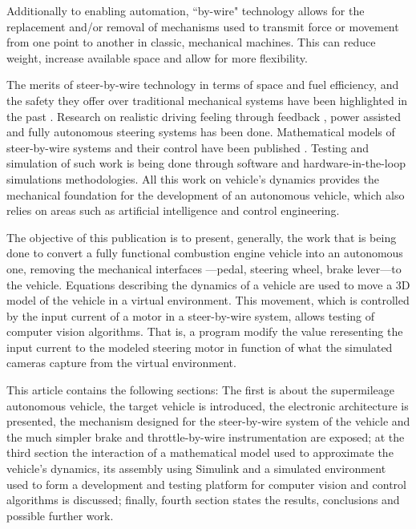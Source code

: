 \documentclass[twocolumn,10pt]{asme2e}
\begin{document}
Additionally to enabling automation, ``by-wire" technology allows for the
replacement and/or removal of mechanisms used to transmit force or movement
from one point to another in classic, mechanical machines. This can reduce
weight, increase available space and allow for more flexibility.

The merits of steer-by-wire technology in terms of space and fuel efficiency,
and the safety they offer over traditional mechanical systems have been
highlighted in the past \cite{fahami, qiang}. Research on realistic driving
feeling through feedback \cite{nguyen}, power assisted \cite{murugan} and
fully autonomous \cite{smith, silva} steering systems has been done. Mathematical
models of steer-by-wire systems and their control have been published
\cite{chang, fahami}. Testing and simulation of such work is being done
through software \cite{fahami} and hardware-in-the-loop simulations
methodologies\cite{park}. All this work on vehicle's dynamics provides
the mechanical foundation for the development of an autonomous vehicle,
which also relies on areas such as artificial intelligence and control
engineering.

The objective of this publication is to present, generally, the work
that is being done to convert a fully functional combustion engine
vehicle into an autonomous one, removing the mechanical interfaces
---pedal, steering wheel, brake lever---to the vehicle. Equations describing the
dynamics of a vehicle are used to move a 3D model of the vehicle in
a virtual environment. This movement, which is controlled by the
input current of a motor in a steer-by-wire system, allows testing
of computer vision algorithms. That is, a program modify the value
reresenting the input current to the modeled steering motor in function of
what the simulated cameras capture from the virtual environment.

This article contains the following sections: The first is about
the supermileage autonomous vehicle, the target vehicle is introduced,
the electronic architecture is presented, the mechanism designed for
the steer-by-wire system of the vehicle and the much simpler
brake and throttle-by-wire instrumentation are exposed; at the third section
the interaction of a mathematical model used to approximate the vehicle's
dynamics, its assembly using Simulink and a simulated environment used
to form a development and testing platform for computer vision and control
algorithms is discussed; finally, fourth section states the results,
conclusions and possible further work.
\end{document}
